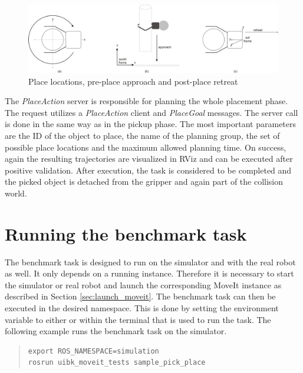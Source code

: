 \begin{figure}[ht]
	\centering
  	\includegraphics[width=1.0\textwidth]{images/place_a-c.jpg}
	\caption{Place locations, pre-place approach and post-place retreat}
	\label{fig:place_stages}
\end{figure}

The \emph{PlaceAction} server is responsible for planning the whole placement phase. The request utilizes a \emph{PlaceAction} client and \emph{PlaceGoal} messages. The server call is done in the same way as in the pickup phase. The most important parameters are the ID of the object to place, the name of the planning group, the set of possible place locations and the maximum allowed planning time.  On success, again the resulting trajectories are visualized in RViz and can be executed after positive validation. After execution, the task is considered to be completed and the picked object is detached from the gripper and again part of the collision world.


\section{Running the benchmark task}

The benchmark task is designed to run on the simulator and with the real robot as well. It only depends on a running  instance. Therefore it is necessary to start the simulator or real robot and launch the corresponding MoveIt instance as described in Section \ref{sec:launch_moveit}. The benchmark task can then be executed in the desired namespace. This is done by setting the  environment variable to either  or  within the terminal that is used to run the task. The following example runs the benchmark task on the simulator.

\begin{quote}
\begin{verbatim}
export ROS_NAMESPACE=simulation
rosrun uibk_moveit_tests sample_pick_place 
\end{verbatim}
\end{quote}

